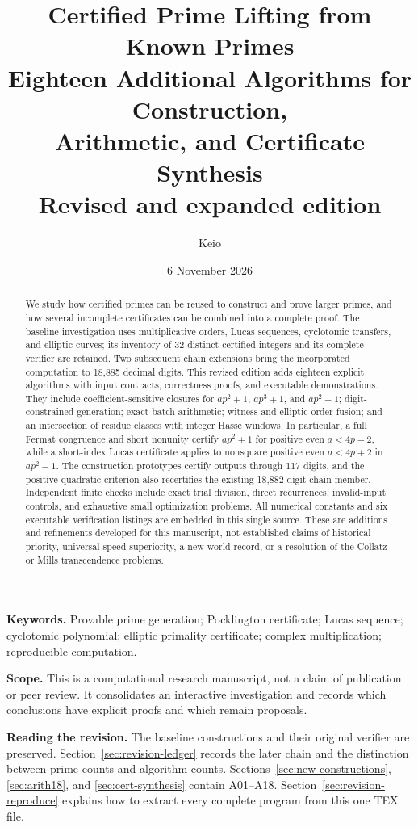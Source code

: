 \documentclass[11pt,a4paper]{article}
\title{\color{inkblue}\bfseries Certified Prime Lifting from Known Primes\\[5pt]
 \large Eighteen Additional Algorithms for Construction,\\
 Arithmetic, and Certificate Synthesis\\[3pt]
 \normalsize Revised and expanded edition}
\author{Keio}
\date{6 November 2026}
\theoremstyle{definition}\newtheorem{definition}[theorem]{Definition}
\theoremstyle{remark}\newtheorem{remark}[theorem]{Remark}
\begin{document}
\maketitle
\begin{abstract}
We study how certified primes can be reused to construct and prove larger
primes, and how several incomplete certificates can be combined into a
complete proof. The baseline investigation uses multiplicative orders,
Lucas sequences, cyclotomic transfers, and elliptic curves; its inventory
of 32 distinct certified integers and its complete verifier are retained.
Two subsequent chain extensions bring the incorporated computation to
18,885 decimal digits. This revised edition adds eighteen explicit
algorithms with input contracts, correctness proofs, and executable
demonstrations. They include coefficient-sensitive closures for
$ap^2+1$, $ap^3+1$, and $ap^2-1$; digit-constrained generation; exact
batch arithmetic; witness and elliptic-order fusion; and an intersection
of residue classes with integer Hasse windows. In particular, a full
Fermat congruence and short nonunity certify $ap^2+1$ for positive even
$a<4p-2$, while a short-index Lucas certificate applies to nonsquare
positive even $a<4p+2$ in $ap^2-1$. The construction prototypes certify
outputs through 117 digits, and the positive quadratic criterion also
recertifies the existing 18,882-digit chain member. Independent finite
checks include exact trial division, direct recurrences, invalid-input
controls, and exhaustive small optimization problems. All numerical
constants and six executable verification listings are embedded in this
single source. These are additions and refinements developed for this
manuscript, not established claims of historical priority, universal speed
superiority, a new world record, or a resolution of the Collatz or Mills
transcendence problems.
\end{abstract}

\noindent\textbf{Keywords.} Provable prime generation; Pocklington certificate;
Lucas sequence; cyclotomic polynomial; elliptic primality certificate;
complex multiplication; reproducible computation.

\noindent\textbf{Scope.} This is a computational research manuscript, not a
claim of publication or peer review. It consolidates an interactive
investigation and records which conclusions have explicit proofs and which
remain proposals.

\medskip
\noindent\textbf{Reading the revision.}
The baseline constructions and their original verifier are preserved.
Section~\ref{sec:revision-ledger} records the later chain and the distinction
between prime counts and algorithm counts.
Sections~\ref{sec:new-constructions}, \ref{sec:arith18}, and
\ref{sec:cert-synthesis} contain A01--A18.
Section~\ref{sec:revision-reproduce} explains how to extract every complete
program from this one TEX file.
\end{document}
